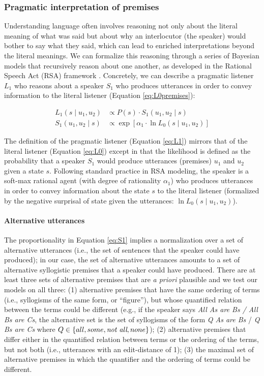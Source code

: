 \documentclass[floatsintext, doc]{apa6}
\begin{document}
\subsubsection{Pragmatic interpretation of premises}

Understanding language often involves reasoning not only about the literal meaning of what was said but about why an interlocutor (the speaker) would bother to say what they said, which can lead to enriched interpretations beyond the literal meanings. 
We can formalize this reasoning through a series of Bayesian models that recursively reason about one another, as developed in the Rational Speech Act (RSA) framework \cite{Frank2012a, goodman2016pragmatic, scontras2018probabilistic}.
Concretely, we can describe a pragmatic listener $L_1$ who reasons about a speaker $S_1$ who produces utterances in order to convey information to the literal listener (Equation \ref{eq:L0premises}):

\begin{align}
L_1(s \mid u_1,  u_2)& \propto  P(s)\cdot S_1(u_1, u_2 \mid s)  \label{eq:L1} \\ 
S_1(u_1, u_2 \mid s) &\propto  \exp [ \alpha_1 \cdot \ln L_0(s \mid u_1,  u_2)]  \label{eq:S1}
\end{align}

The definition of the pragmatic listener (Equation \ref{eq:L1}) mirrors that of the literal listener (Equation \ref{eq:L0}) except in that the likelihood is defined as the probability that a speaker $S_1$ would produce utterances (premises) $u_1$ and $u_2$ given a state $s$.
Following standard practice in RSA modeling, the speaker is a soft-max rational agent (with degree of rationality $\alpha_1$) who produces utterances in order to convey information about the state $s$ to the literal listener (formalized by the negative surprisal of state given the utterances: $\ln L_0(s \mid u_1,  u_2)$).

\paragraph{Alternative utterances}
The proportionality in Equation \ref{eq:S1} implies a normalization over a set of alternative utterances (i.e., the set of sentences that the speaker could have produced); in our case, the set of alternative utterances amounts to a set of alternative syllogistic premises that a speaker could have produced. 
There are at least three sets of alternative premises that are \emph{a priori} plausible and we test our models on all three: (1) alternative premises that have the same ordering of terms (i.e., syllogisms of the same form, or ``figure''), but whose quantified relation between the terms could be different (e.g., if the speaker says \emph{All As are Bs / All Bs are Cs}, the alternative set is the set of syllogisms of the form \emph{Q As are Bs} / \emph{Q Bs are Cs} where $Q \in \{all, some, \emph{not all}, none\}$); (2) alternative premises that differ either in the quantified relation between terms or the ordering of the terms, but not both (i.e., utterances with an edit-distance of 1); (3) the maximal set of alternative premises in which the quantifier and the ordering of terms could be different.
\end{document}
